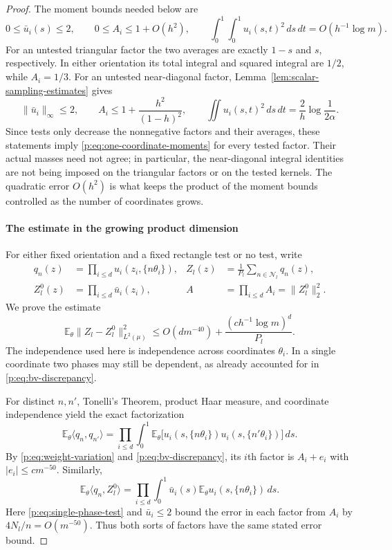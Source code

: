\begin{proof}
The moment bounds needed below are
\begin{equation}\label{p:eq:one-coordinate-moments}
 0\le\bar u_i(s)\le2,\qquad
 0\le A_i\le1+O(h^2),\qquad
 \int_0^1\int_0^1u_i(s,t)^2\,ds\,dt
       =O(h^{-1}\log m).
\end{equation}
For an untested triangular factor the two averages are exactly $1-s$
and $s$, respectively.  In either orientation its total integral and
squared integral are $1/2$, while $A_i=1/3$.  For an untested
near-diagonal factor, Lemma~\ref{lem:scalar-sampling-estimates} gives
\[
 \|\bar u_i\|_\infty\le2,\qquad
 A_i\le1+\frac{h^2}{(1-h)^2},\qquad
 \iint u_i(s,t)^2\,ds\,dt=\frac2h\log\frac1{2\alpha}.
\]
Since tests only decrease the nonnegative factors and their averages,
these statements imply \eqref{p:eq:one-coordinate-moments} for every
tested factor.  Their actual masses need not agree; in particular,
the near-diagonal integral identities are not being imposed on the
triangular factors or on the tested kernels.  The quadratic error
$O(h^2)$ is what keeps the product of the moment bounds controlled as
the number of coordinates grows.

\paragraph{The estimate in the growing product dimension}

For either fixed orientation and a fixed rectangle test or no test,
write
\[
 \begin{aligned}
 q_n(z)&=\prod_{i\le d}u_i(z_i,\{n\theta_i\}),&
 Z_l(z)&=\frac1{P_l}\sum_{n\in\mathcal N_l}q_n(z),\\
 Z_l^0(z)&=\prod_{i\le d}\bar u_i(z_i),&
 A&=\prod_{i\le d}A_i=\|Z_l^0\|_2^2.
 \end{aligned}
\]
We prove the estimate
\begin{equation}\label{p:eq:sampling-L2}
 \mathbb E_\theta\|Z_l-Z_l^0\|_{L^2(\mu)}^2
 \le O(dm^{-40})+\frac{(c h^{-1}\log m)^d}{P_l}.
\end{equation}
The independence used here is independence across coordinates
$\theta_i$.  In a single coordinate two phases may still be
dependent, as already accounted for in \eqref{p:eq:bv-discrepancy}.

For distinct $n,n'$, Tonelli's Theorem, product Haar measure, and
coordinate independence yield the exact factorization
\[
 \mathbb E_\theta\langle q_n,q_{n'}\rangle
 =\prod_{i\le d}\int_0^1
   \mathbb E_\theta\bigl[
    u_i(s,\{n\theta_i\})u_i(s,\{n'\theta_i\})\bigr]\,ds.
\]
By \eqref{p:eq:weight-variation} and \eqref{p:eq:bv-discrepancy}, its
$i$th factor is $A_i+e_i$ with $|e_i|\le c m^{-50}$.
Similarly,
\[
 \mathbb E_\theta\langle q_n,Z_l^0\rangle
 =\prod_{i\le d}\int_0^1
       \bar u_i(s)\mathbb E_\theta u_i(s,\{n\theta_i\})\,ds.
\]
Here \eqref{p:eq:single-phase-test} and $\bar u_i\le2$ bound the
error in each factor from $A_i$ by $4N_l/n=O(m^{-50})$.
Thus both sorts of factors have the same stated error bound.


\end{proof}
